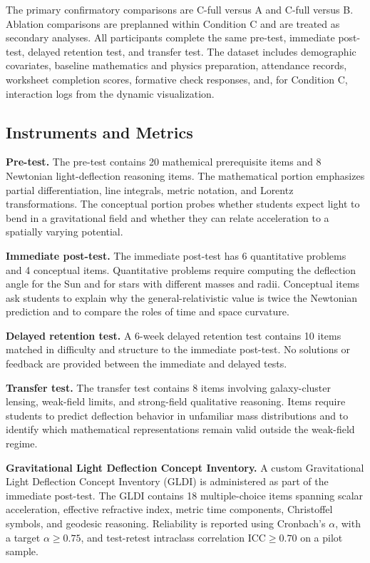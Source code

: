 \documentclass{article}
\begin{document}
The primary confirmatory comparisons are C-full versus A and C-full versus B. Ablation comparisons are preplanned within Condition C and are treated as secondary analyses. All participants complete the same pre-test, immediate post-test, delayed retention test, and transfer test. The dataset includes demographic covariates, baseline mathematics and physics preparation, attendance records, worksheet completion scores, formative check responses, and, for Condition C, interaction logs from the dynamic visualization.

\subsection{Instruments and Metrics}

\textbf{Pre-test.} The pre-test contains 20 mathemical prerequisite items and 8 Newtonian light-deflection reasoning items. The mathematical portion emphasizes partial differentiation, line integrals, metric notation, and Lorentz transformations. The conceptual portion probes whether students expect light to bend in a gravitational field and whether they can relate acceleration to a spatially varying potential.

\textbf{Immediate post-test.} The immediate post-test has 6 quantitative problems and 4 conceptual items. Quantitative problems require computing the deflection angle for the Sun and for stars with different masses and radii. Conceptual items ask students to explain why the general-relativistic value is twice the Newtonian prediction and to compare the roles of time and space curvature.

\textbf{Delayed retention test.} A 6-week delayed retention test contains 10 items matched in difficulty and structure to the immediate post-test. No solutions or feedback are provided between the immediate and delayed tests.

\textbf{Transfer test.} The transfer test contains 8 items involving galaxy-cluster lensing, weak-field limits, and strong-field qualitative reasoning. Items require students to predict deflection behavior in unfamiliar mass distributions and to identify which mathematical representations remain valid outside the weak-field regime.

\textbf{Gravitational Light Deflection Concept Inventory.} A custom Gravitational Light Deflection Concept Inventory (GLDI) is administered as part of the immediate post-test. The GLDI contains 18 multiple-choice items spanning scalar acceleration, effective refractive index, metric time components, Christoffel symbols, and geodesic reasoning. Reliability is reported using Cronbach's \(\alpha\), with a target \(\alpha \ge 0.75\), and test-retest intraclass correlation \(\mathrm{ICC} \ge 0.70\) on a pilot sample.
\end{document}
